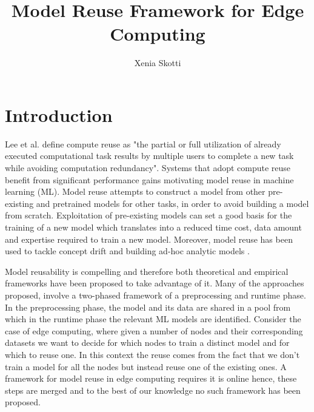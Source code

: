 \documentclass{mpaper}
\begin{document}
\title{Model Reuse Framework for Edge Computing}
\author{Xenia Skotti}

\maketitle

\begin{abstract}

\end{abstract}


\section{Introduction}

Lee et al. \cite{ComputeReuse} define compute reuse as "the partial or full utilization of already executed computational task results by multiple users to complete a new task while avoiding computation redundancy".  Systems that adopt compute reuse benefit from significant performance gains motivating model reuse in machine learning (ML). Model reuse \cite{Learnware} attempts to construct a model from other pre-existing and pretrained models for other tasks, in order to avoid building a model from scratch. Exploitation of pre-existing models can set a good basis for the training of a new model which translates into a reduced time cost, data amount and expertise required to train a new model. Moreover, model reuse has been used to tackle concept drift \cite{ConceptDrift} and building ad-hoc analytic models \cite{MaterializationReuse}.

Model reusability is compelling and therefore both theoretical \cite{Learnware} and empirical \cite{MaterializationReuse}\cite{KernelMMD}  frameworks have been proposed to take advantage of it. Many of the approaches proposed, involve a two-phased framework of a preprocessing and runtime phase. In the preprocessing phase, the model and its data are shared in a pool from which in the runtime phase the relevant ML models are identified. Consider the case of edge computing, where given a number of nodes and their corresponding datasets we want to decide for which nodes to train a distinct model and for which to reuse one. In this context the reuse comes from the fact that we don’t train a model for all the nodes but instead reuse one of the existing ones. A framework for model reuse in edge computing requires it is online hence, these steps are merged and to the best of our knowledge no such framework has been proposed. 
\end{document}
